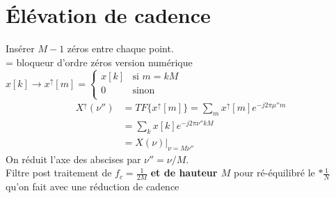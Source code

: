 \documentclass{article}
\theoremstyle{plain}%
\theoremstyle{definition}
\theoremstyle{remark}
\begin{document}
\section{Élévation de cadence}
Insérer $ M - 1 $ zéros entre chaque point. \\
= bloqueur d'ordre zéros version numérique \\
$ x[k] \to x^\uparrow [m] = \begin{cases}
x[k] &\text{si } m=kM\\
0 &\text{sinon}\\
\end{cases}  $ \begin{align*}
    X^\uparrow (\nu '') &= TF \{x^\uparrow [m]\} = \sum_{m}^{}x^\uparrow [m] e^{-j 2 \pi \mu '' m} \\
    &= \sum_{k}^{}x[k] e^{-j 2 \pi \nu '' kM} \\
    &= X(\nu ) \vert _{\nu  = M \nu ''}
\end{align*}
On réduit l'axe des abscises par $ \nu '' = \nu / M $. \\
Filtre post traitement de $ f_c = \frac{1}{2M} $ \textbf{et de hauteur $ M $ } pour ré-équilibré le $ * \frac{1}{N} $ qu'on fait avec une réduction de cadence
\end{document}
